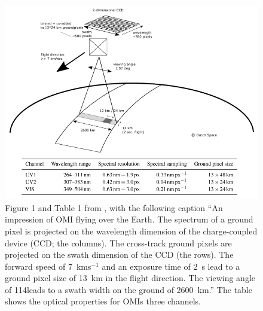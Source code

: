   \begin{figure}
    \includegraphics[width=\textwidth]{Figures/Shenkeveld_OMI_summary.png}
    \caption{ %
      Figure 1 and Table 1 from \textcite{Schenkeveld2017}, with the following caption ``An impression of OMI flying over the Earth.
      The spectrum of a ground pixel is projected on the wavelength dimension of the charge-coupled device (CCD; the columns). 
      The cross-track ground pixels are projected on the swath dimension of the CCD (the rows).
      The forward speed of 7~kms$^{-1}$ and an exposure time of 2~s lead to a ground pixel size of 13~km in the flight direction.
      The viewing angle of 114\degr leads to a swath width on the ground of 2600~km.''
      The table shows the optical properties for OMIs three channels.}
    \label{LR:HCHO:Sat:fig_Shenkeveld_OMI_summary}
  \end{figure}

